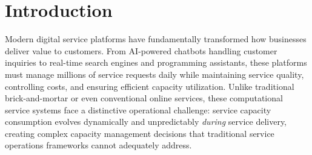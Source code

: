 \documentclass[poms,final,blindrev]{poms1_V1} %
\begin{document}
\maketitle

%


\section{Introduction}

Modern digital service platforms have fundamentally transformed how businesses deliver value to customers. From AI-powered chatbots handling customer inquiries to real-time search engines and programming assistants, these platforms must manage millions of service requests daily while maintaining service quality, controlling costs, and ensuring efficient capacity utilization. Unlike traditional brick-and-mortar or even conventional online services, these computational service systems face a distinctive operational challenge: service capacity consumption evolves dynamically and unpredictably \textit{during} service delivery, creating complex capacity management decisions that traditional service operations frameworks cannot adequately address.
\end{document}
